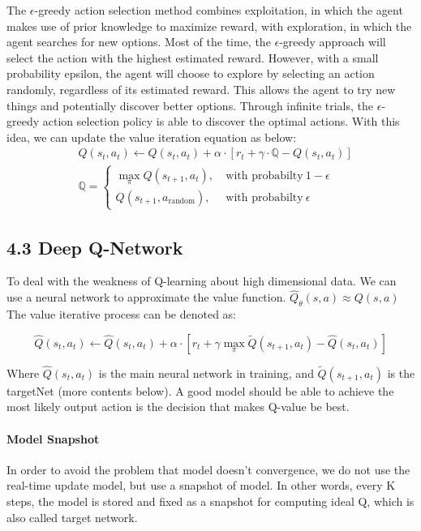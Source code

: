 \documentclass[letterpaper]{article} %
\begin{document}
\hspace*{1em}The {\large $\epsilon$}-greedy action selection method combines exploitation, in which the agent makes use of prior knowledge to maximize reward, with exploration, in which the agent searches for new options. Most of the time, the $\epsilon$-greedy approach will select the action with the highest estimated reward. However, with a small probability epsilon, the agent will choose to explore by selecting an action randomly, regardless of its estimated reward. This allows the agent to try new things and potentially discover better options. Through infinite trials, the $\epsilon$-greedy action selection policy is able to discover the optimal actions. With this idea, we can update the value iteration equation as below:
\begin{align*}
	&Q(s_t,a_t)\leftarrow Q(s_t,a_t)+\alpha\cdot\left[r_t+\gamma\cdot\mathbb{Q}-Q(s_t,a_t)\right]\\
	&\mathbb{Q} = \begin{cases}
		\max_\pi Q(s_{t+1},a_t),\ &\text{with probabilty}\ 1-\epsilon\\
		Q(s_{t+1},a_{\text{random}}),\ &\text{with probabilty}\ \epsilon
	\end{cases}
\end{align*}

\subsection{4.3 Deep Q-Network}

\hspace*{1em}To deal with the weakness of Q-learning about high dimensional data. We can use a neural network to approximate the value function. $\hat{Q}_\theta(s,a)\approx Q(s,a)$ The value iterative process can be denoted as: 
\begin{small}
	$$\hat{Q}(s_t,a_t)\leftarrow \hat{Q}(s_t,a_t)+\alpha\cdot\left[r_t+\gamma\max_\pi \tilde{Q}(s_{t+1},a_t)-\hat{Q}(s_t,a_t)\right]$$
\end{small}
\hspace*{1em}Where $\hat{Q}(s_t,a_t)$ is the main neural network in training, and $\tilde{Q}(s_{t+1},a_t)$ is the targetNet (more contents below). A good model should be able to achieve the most likely output action is the decision that makes Q-value be best.

\paragraph{Model Snapshot} In order to avoid the problem that model doesn't convergence, we do not use the real-time update model, but use a snapshot of model. In other words, every K steps, the model is stored and fixed as a snapshot for computing ideal Q, which is also called target network.
\end{document}
